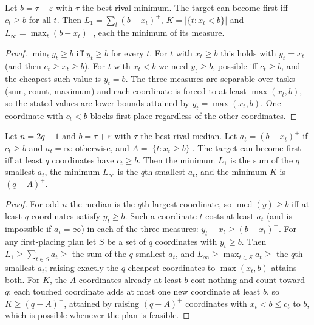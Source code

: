 \begin{proposition}[Minimum]\label{prop:min}
Let $b=\tau+\varepsilon$ with $\tau$ the best rival minimum. The target can become first iff $c_t\ge b$ for all $t$. Then $L_1=\sum_t(b-x_t)^+$, $K=|\{t:x_t<b\}|$ and $L_\infty=\max_t(b-x_t)^+$, each the minimum of its measure.
\end{proposition}
\begin{proof}
$\min_t y_t\ge b$ iff $y_t\ge b$ for every $t$. For $t$ with $x_t\ge b$ this holds with $y_t=x_t$ (and then $c_t\ge x_t\ge b$). For $t$ with $x_t<b$ we need $y_t\ge b$, possible iff $c_t\ge b$, and the cheapest such value is $y_t=b$. The three measures are separable over tasks (sum, count, maximum) and each coordinate is forced to at least $\max(x_t,b)$, so the stated values are lower bounds attained by $y_t=\max(x_t,b)$. One coordinate with $c_t<b$ blocks first place regardless of the other coordinates.
\end{proof}

\begin{proposition}\label{prop:median}
Let $n=2q-1$ and $b=\tau+\varepsilon$ with $\tau$ the best rival median. Let $a_t=(b-x_t)^+$ if $c_t\ge b$ and $a_t=\infty$ otherwise, and $A=|\{t:x_t\ge b\}|$. The target can become first iff at least $q$ coordinates have $c_t\ge b$. Then the minimum $L_1$ is the sum of the $q$ smallest $a_t$, the minimum $L_\infty$ is the $q$th smallest $a_t$, and the minimum $K$ is $(q-A)^+$.
\end{proposition}
\begin{proof}
For odd $n$ the median is the $q$th largest coordinate, so $\operatorname{med}(y)\ge b$ iff at least $q$ coordinates satisfy $y_t\ge b$. Such a coordinate $t$ costs at least $a_t$ (and is impossible if $a_t=\infty$) in each of the three measures: $y_t-x_t\ge(b-x_t)^+$. For any first-placing plan let $S$ be a set of $q$ coordinates with $y_t\ge b$. Then $L_1\ge\sum_{t\in S}a_t\ge$ the sum of the $q$ smallest $a_t$, and $L_\infty\ge\max_{t\in S}a_t\ge$ the $q$th smallest $a_t$; raising exactly the $q$ cheapest coordinates to $\max(x_t,b)$ attains both. For $K$, the $A$ coordinates already at least $b$ cost nothing and count toward $q$; each touched coordinate adds at most one new coordinate at least $b$, so $K\ge(q-A)^+$, attained by raising $(q-A)^+$ coordinates with $x_t<b\le c_t$ to $b$, which is possible whenever the plan is feasible.
\end{proof}

